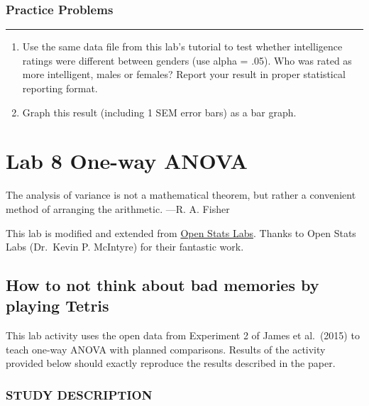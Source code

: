 \documentclass[
]{book}
\begin{document}
\hypertarget{practice-problems-5}{%
\subsection{Practice Problems}\label{practice-problems-5}}

\begin{center}\rule{0.5\linewidth}{0.5pt}\end{center}

\begin{enumerate}
\def\labelenumi{\arabic{enumi}.}
\item
  Use the same data file from this lab's tutorial to test whether intelligence ratings were different between genders (use alpha = .05). Who was rated as more intelligent, males or females? Report your result in proper statistical reporting format.
\item
  Graph this result (including 1 SEM error bars) as a bar graph.
\end{enumerate}

\hypertarget{lab-8-one-way-anova}{%
\chapter{Lab 8 One-way ANOVA}\label{lab-8-one-way-anova}}

{The analysis of variance is not a mathematical theorem, but rather a convenient method of arranging the arithmetic. ---R. A. Fisher}

This lab is modified and extended from \href{https://sites.trinity.edu/osl}{Open Stats Labs}. Thanks to Open Stats Labs (Dr.~Kevin P. McIntyre) for their fantastic work.

\hypertarget{how-to-not-think-about-bad-memories-by-playing-tetris}{%
\section{How to not think about bad memories by playing Tetris}\label{how-to-not-think-about-bad-memories-by-playing-tetris}}

This lab activity uses the open data from Experiment 2 of James et al.~(2015) to teach one-way ANOVA with planned comparisons. Results of the activity provided below should exactly reproduce the results described in the paper.

\hypertarget{study-description-2}{%
\subsection{STUDY DESCRIPTION}\label{study-description-2}}
\end{document}
